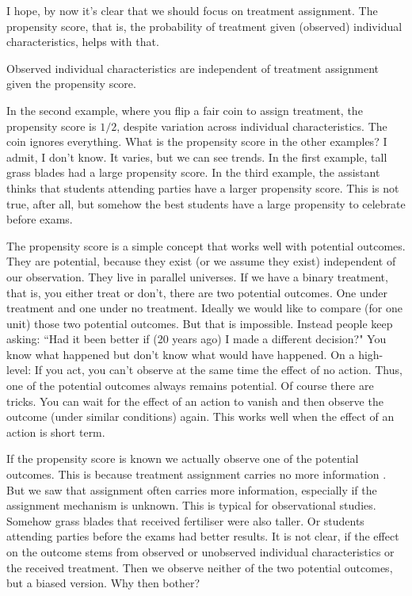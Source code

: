 I hope, by now it's clear that 
we should focus on treatment assignment.
The propensity score\cite{Rosenbaum1983}, that is,
the probability of treatment given (observed) individual characteristics,
helps with that.
\begin{theorem*}
  \emph{\cite[Theorem~1]{Rosenbaum1983}}
Observed individual characteristics are independent 
of treatment assignment given the propensity score.
\end{theorem*}



In the second example, where you flip a fair coin to assign treatment, the propensity score is $1/2$, despite variation across individual characteristics.
The coin ignores everything.
What is the propensity score in the other examples?
I admit, I don't know.
It varies, but we can see trends. 
In the first example, tall grass blades had a large propensity score.
In the third example, the assistant thinks that students attending parties have a larger propensity score. This is not true, after all, but somehow the best students have a large propensity to celebrate before exams. 

The propensity score is a simple concept that works well with potential outcomes.
They are potential, because they exist (or we assume they exist) independent of our observation. They live in parallel universes.
If we have a binary treatment, that is, you either treat or don't, there are two potential outcomes. One under treatment and one under no treatment.
Ideally we would like to compare (for one unit) those two potential outcomes.
But that is impossible. 
Instead people keep asking:
“Had it been better if (20 years ago) I made a different decision?"
You know what happened but don't know what would have happened.
On a high-level: If you act, you can't observe at the same time the effect of no action.
Thus, one of the potential outcomes always remains potential.
Of course there are tricks. You can  wait for the effect of an action to vanish and then observe the outcome (under similar conditions) again.
This works well when the effect of an action is short term.

If the propensity score is known we actually observe one of the potential outcomes.
This is because treatment assignment carries no more information \emph{\cite[Theorem~1]{Rosenbaum1983}}.
But we saw that assignment often carries more information, especially if the assignment mechanism is unknown.
This is typical for observational studies.
Somehow grass blades that received fertiliser were also taller.
Or students attending parties before the exams had better results.
It is not clear, if the effect on the outcome stems from observed or unobserved individual characteristics or the received treatment.
Then we observe neither of the two potential outcomes, but a biased version.
Why then bother?

